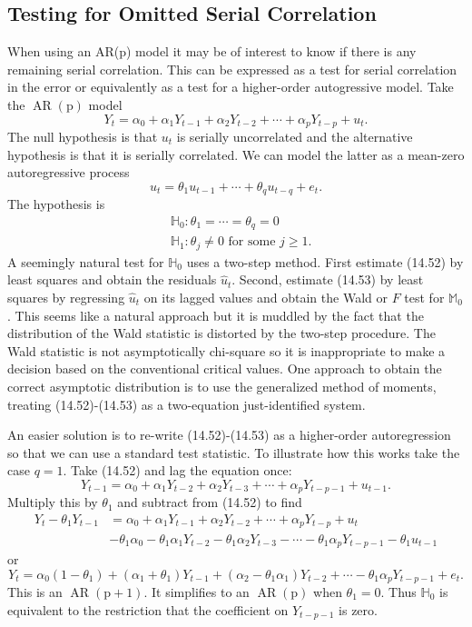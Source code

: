 \documentclass[10pt]{article}
\begin{document}
\subsection{Testing for Omitted Serial Correlation}
When using an AR(p) model it may be of interest to know if there is any remaining serial correlation. This can be expressed as a test for serial correlation in the error or equivalently as a test for a higher-order autogressive model. Take the $\operatorname{AR}(\mathrm{p})$ model
$$
Y_{t}=\alpha_{0}+\alpha_{1} Y_{t-1}+\alpha_{2} Y_{t-2}+\cdots+\alpha_{p} Y_{t-p}+u_{t} .
$$
The null hypothesis is that $u_{t}$ is serially uncorrelated and the alternative hypothesis is that it is serially correlated. We can model the latter as a mean-zero autoregressive process
$$
u_{t}=\theta_{1} u_{t-1}+\cdots+\theta_{q} u_{t-q}+e_{t} .
$$
The hypothesis is
$$
\begin{aligned}
&\mathbb{H}_{0}: \theta_{1}=\cdots=\theta_{q}=0 \\
&\mathbb{H}_{1}: \theta_{j} \neq 0 \text { for some } j \geq 1 .
\end{aligned}
$$
A seemingly natural test for $\mathbb{H}_{0}$ uses a two-step method. First estimate (14.52) by least squares and obtain the residuals $\widehat{u}_{t}$. Second, estimate (14.53) by least squares by regressing $\widehat{u}_{t}$ on its lagged values and obtain the Wald or $F$ test for $\mathbb{M}_{0}$. This seems like a natural approach but it is muddled by the fact that the distribution of the Wald statistic is distorted by the two-step procedure. The Wald statistic is not asymptotically chi-square so it is inappropriate to make a decision based on the conventional critical values. One approach to obtain the correct asymptotic distribution is to use the generalized method of moments, treating (14.52)-(14.53) as a two-equation just-identified system.

An easier solution is to re-write (14.52)-(14.53) as a higher-order autoregression so that we can use a standard test statistic. To illustrate how this works take the case $q=1$. Take (14.52) and lag the equation once:
$$
Y_{t-1}=\alpha_{0}+\alpha_{1} Y_{t-2}+\alpha_{2} Y_{t-3}+\cdots+\alpha_{p} Y_{t-p-1}+u_{t-1} .
$$
Multiply this by $\theta_{1}$ and subtract from (14.52) to find
$$
\begin{aligned}
Y_{t}-\theta_{1} Y_{t-1} &=\alpha_{0}+\alpha_{1} Y_{t-1}+\alpha_{2} Y_{t-2}+\cdots+\alpha_{p} Y_{t-p}+u_{t} \\
&-\theta_{1} \alpha_{0}-\theta_{1} \alpha_{1} Y_{t-2}-\theta_{1} \alpha_{2} Y_{t-3}-\cdots-\theta_{1} \alpha_{p} Y_{t-p-1}-\theta_{1} u_{t-1}
\end{aligned}
$$
or
$$
Y_{t}=\alpha_{0}\left(1-\theta_{1}\right)+\left(\alpha_{1}+\theta_{1}\right) Y_{t-1}+\left(\alpha_{2}-\theta_{1} \alpha_{1}\right) Y_{t-2}+\cdots-\theta_{1} \alpha_{p} Y_{t-p-1}+e_{t} .
$$
This is an $\operatorname{AR}(\mathrm{p}+1)$. It simplifies to an $\operatorname{AR}(\mathrm{p})$ when $\theta_{1}=0$. Thus $\mathbb{H}_{0}$ is equivalent to the restriction that the coefficient on $Y_{t-p-1}$ is zero.
\end{document}
